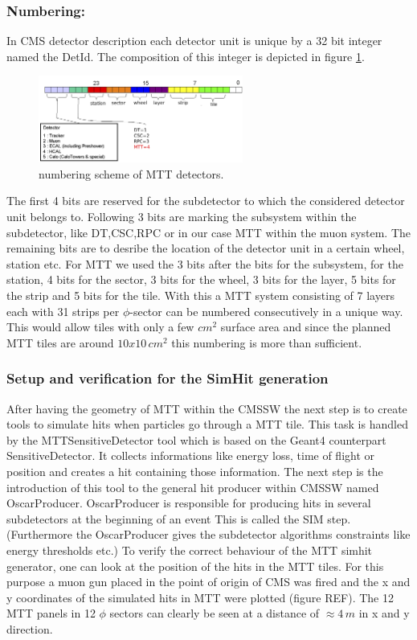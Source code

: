 		\subsubsection*{Numbering:}
		In CMS detector description each detector unit is unique by a 32 bit integer named the DetId.
		The composition of this integer is depicted in figure \ref{fig:numbering}.
		\begin{figure}[htbp]
			\centering
			\includegraphics[width=0.6\textwidth]{Figures/erdogan/numbering.png}
			\caption{numbering scheme of MTT detectors.}
			\label{fig:numbering}
		\end{figure}
		The first 4 bits are reserved for the subdetector to which the considered detector unit belongs to.
		Following 3 bits are marking the subsystem within the subdetector, like DT,CSC,RPC or in our case MTT within the muon system.
		The remaining bits are to desribe the location of the detector unit in a certain wheel, station etc.
		For MTT we used the 3 bits after the bits for the subsystem, for the station, 4 bits for the sector, 3 bits for the wheel, 3 bits for the layer, 5 bits for the strip and 5 bits for the tile.
		With this a MTT system consisting of 7 layers each with 31 strips per $\phi$-sector can be numbered consecutively in a unique way.
		This would allow tiles with only a few $cm^2$ surface area and since the planned MTT tiles are around $10x10\,cm^2$ this numbering is more than sufficient.
	\subsubsection{Setup and verification for the SimHit generation}
		After having the geometry of MTT within the CMSSW the next step is to create tools to simulate hits when particles go through a MTT tile.
		This task is handled by the MTTSensitiveDetector tool which is based on the Geant4 counterpart SensitiveDetector.
		It collects informations like energy loss, time of flight or position and creates a hit containing those information.
		The next step is the introduction of this tool to the general hit producer within CMSSW named OscarProducer.
		OscarProducer is responsible for producing hits in several subdetectors at the beginning of an event
		This is called the SIM step.
		(Furthermore the OscarProducer gives the subdetector algorithms constraints like energy thresholds etc.)
		To verify the correct behaviour of the MTT simhit generator, one can look at the position of the hits in the MTT tiles.
		For this purpose a muon gun placed in the point of origin of CMS was fired and the x and y coordinates of the simulated hits in MTT were plotted (figure REF).
		The 12 MTT panels in 12 $\phi$ sectors can clearly be seen at a distance of $\approx4\,m$ in x and y direction.
